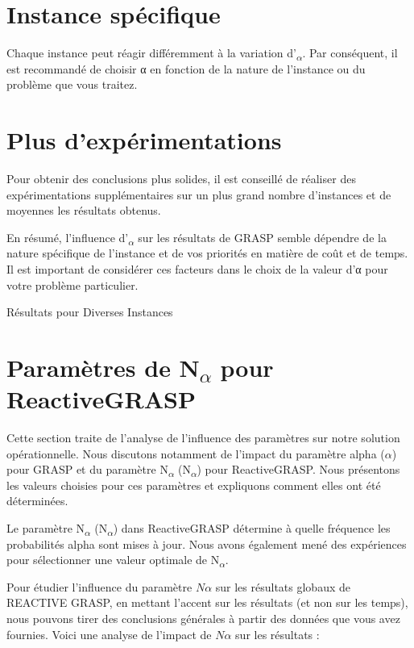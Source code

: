 \documentclass[12pt]{article}
\begin{document}
\section{Instance spécifique}

Chaque instance peut réagir différemment à la variation d'\textsubscript{\(\alpha\)}. Par conséquent, il est recommandé de choisir α en fonction de la nature de l'instance ou du problème que vous traitez.

\section{Plus d'expérimentations}

Pour obtenir des conclusions plus solides, il est conseillé de réaliser des expérimentations supplémentaires sur un plus grand nombre d'instances et de moyennes les résultats obtenus.

En résumé, l'influence d'\textsubscript{\(\alpha\)} sur les résultats de GRASP semble dépendre de la nature spécifique de l'instance et de vos priorités en matière de coût et de temps. Il est important de considérer ces facteurs dans le choix de la valeur d'α pour votre problème particulier.


\begin{table}[h]
  \centering
  \caption{Résultats pour Diverses Instances}
\end{table}

\section*{Paramètres de N\textsubscript{$\alpha$} pour ReactiveGRASP}
Cette section traite de l'analyse de l'influence des paramètres sur notre solution opérationnelle. Nous discutons notamment de l'impact du paramètre alpha (\(\alpha\)) pour GRASP et du paramètre N\textsubscript{$\alpha$} (N\textsubscript{$\alpha$}) pour ReactiveGRASP. Nous présentons les valeurs choisies pour ces paramètres et expliquons comment elles ont été déterminées.

Le paramètre N\textsubscript{$\alpha$} (N\textsubscript{$\alpha$}) dans ReactiveGRASP détermine à quelle fréquence les probabilités alpha sont mises à jour. Nous avons également mené des expériences pour sélectionner une valeur optimale de N\textsubscript{$\alpha$}.

Pour étudier l'influence du paramètre \(N\alpha\) sur les résultats globaux de REACTIVE GRASP, en mettant l'accent sur les résultats (et non sur les temps), nous pouvons tirer des conclusions générales à partir des données que vous avez fournies. Voici une analyse de l'impact de \(N\alpha\) sur les résultats :
\end{document}
